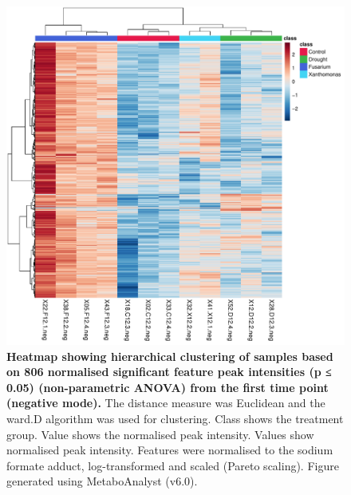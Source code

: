 \newpage
\begin{figure}[htp!]
    \centering
    \includegraphics[width=\textwidth]{Appendices/RedSamplesSecondTimePoint-NonParametric-ExcludingQCs_heatmap_2_dpi72.pdf}
    \caption[Heatmap showing hierarchical clustering of samples based on 806 normalised significant feature peak intensities (p ≤ 0.05) from the first time point (negative mode)]{\textbf{Heatmap showing hierarchical clustering of samples based on 806 normalised significant feature peak intensities (p ≤ 0.05) (non-parametric ANOVA) from the first time point (negative mode).} The distance measure was Euclidean and the ward.D algorithm was used for clustering. Class shows the treatment group. Value shows the normalised peak intensity. Values show normalised peak intensity. Features were normalised to the sodium formate  adduct, log-transformed and scaled (Pareto scaling). Figure generated using MetaboAnalyst (v6.0).}
    \label{fig:Sig806FeaturesNegMode}
\end{figure}
